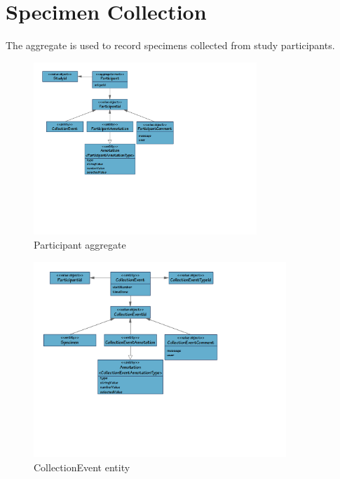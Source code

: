 \chapter{Specimen Collection}

The  aggregate is used to record specimens collected
from study participants.

\begin{figure}[H]
  \includegraphics[trim={10mm 75mm 102mm 10mm}, clip,
    width=0.75\textwidth]{images/participant-aggregate}
  \caption{Participant aggregate}
  \label{fig:participant-aggregate}
\end{figure}

\begin{figure}[H]
  \includegraphics[trim={10mm 66mm 75mm 10mm}, clip,
    width=0.85\textwidth]{images/collection-event}
  \caption{CollectionEvent entity}
  \label{fig:collection-event}
\end{figure}
